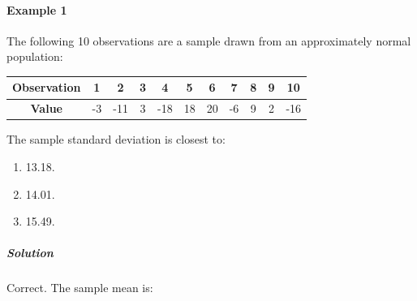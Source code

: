 \paragraph{Example 1} %
The following 10 observations are a sample drawn from an approximately normal population:
\table[H]
	\caption{Sample Observations}
	\begin{center}
		\begin{tabular}{|c|c|c|c|c|c|c|c|c|c|c|}
			\hline
			\textbf{Observation} & 1 & 2 & 3 & 4 & 5 & 6 & 7 & 8 & 9 & 10 \\
			\hline
			\textbf{Value} & -3 & -11 & 3 & -18 & 18 & 20 & -6 & 9 & 2 & -16 \\
			\hline
		\end{tabular}
	\end{center}
The sample standard deviation is closest to:
\begin{enumerate}[label=\Alph*.]
	\item 13.18.
	\item 14.01.
	\item 15.49.
\end{enumerate}
\subparagraph{Solution} %
Correct. The sample mean is:












